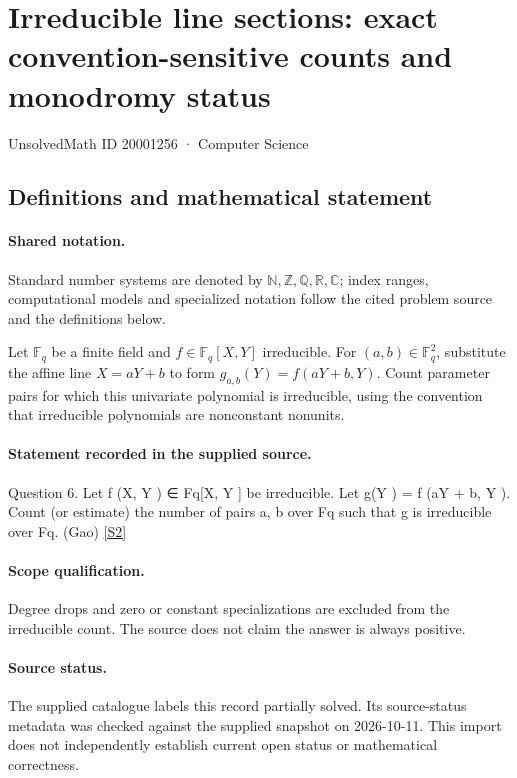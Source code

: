 \documentclass[11pt]{article}
\newcommand{\sref}[2]{\hyperlink{source:#1:#2}{[S#2]}}
\begin{document}
\setcounter{section}{20001255}
\section{Irreducible line sections: exact convention-sensitive counts and monodromy status}\label{20001256}
{\small\sffamily UnsolvedMath ID 20001256 · Computer Science}
\subsection{Definitions and mathematical statement}

\paragraph{Shared notation.}Standard number systems are denoted by $\mathbb N,\mathbb Z,\mathbb Q,\mathbb R,\mathbb C$; index ranges, computational models and specialized notation follow the cited problem source and the definitions below.


Let $\mathbb F_q$ be a finite field and $f\in\mathbb F_q[X,Y]$ irreducible. For $(a,b)\in\mathbb F_q^2$, substitute the affine line $X=aY+b$ to form $g_{a,b}(Y)=f(aY+b,Y)$. Count parameter pairs for which this univariate polynomial is irreducible, using the convention that irreducible polynomials are nonconstant nonunits.
\paragraph{Statement recorded in the supplied source.}
Question 6. Let f (X, Y ) ∈ Fq[X, Y ] be irreducible. Let g(Y ) = f (aY + b, Y ). Count (or estimate) the number of pairs a, b over Fq such that g is irreducible over Fq. (Gao) \sref{20001256}{2}
\paragraph{Scope qualification.}
Degree drops and zero or constant specializations are excluded from the irreducible count. The source does not claim the answer is always positive.
\paragraph{Source status.}
The supplied catalogue labels this record partially solved. Its source-status metadata was checked against the supplied snapshot on 2026-10-11. This import does not independently establish current open status or mathematical correctness.
\end{document}
